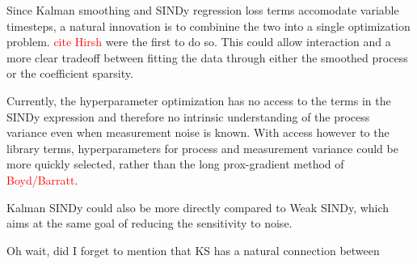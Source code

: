 \documentclass{article}
\newcommand{\red}[1]{\textcolor{red}{#1}}
\begin{document}
Since Kalman smoothing and SINDy regression loss terms accomodate variable timesteps, a natural innovation is to combinine the two into a single optimization problem.  \red{cite Hirsh} were the first to do so.  This could allow interaction and a more clear tradeoff between fitting the data through either the smoothed process or the coefficient sparsity.

Currently, the hyperparameter optimization has no access to the terms in the SINDy expression and therefore no intrinsic understanding of the process variance even when measurement noise is known.  With access however to the library terms, hyperparameters for process and measurement variance could be more quickly selected, rather than the long prox-gradient method of \red{Boyd/Barratt}.

Kalman SINDy could also be more directly compared to Weak SINDy, which aims at the same goal of reducing the sensitivity to noise.

Oh wait, did I forget to mention that KS has a natural connection between 


\end{document}
